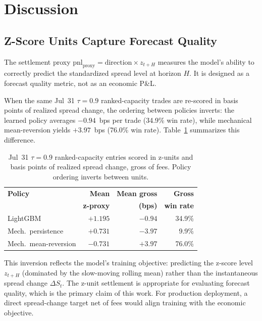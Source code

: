 \section{Discussion}\label{sec:discussion}

\subsection{Z-Score Units Capture Forecast Quality}\label{sec:proxy_gap}

The settlement proxy $\text{pnl}_{\text{proxy}} = \text{direction} \times
z_{t+H}$ measures the model's ability to correctly predict the standardized
spread level at horizon $H$. It is designed as a forecast quality metric, not as
an economic P\&L.

When the same Jul~31 $\tau{=}0.9$ ranked-capacity trades are re-scored in basis points of realized spread change, the ordering between policies inverts: the learned policy averages $-0.94$~bps per trade (34.9\% win rate), while mechanical mean-reversion yields $+3.97$~bps (76.0\% win rate). Table~\ref{tab:bps} summarizes this difference.

\begin{table}[h]
\caption{Jul~31 $\tau{=}0.9$ ranked-capacity entries scored in z-units and basis points of realized spread change, gross of fees. Policy ordering inverts between units.}
\label{tab:bps}
\begin{tabular}{lrrr}
\toprule
\textbf{Policy} & \textbf{Mean} & \textbf{Mean gross} & \textbf{Gross} \\
 & \textbf{z-proxy} & \textbf{(bps)} & \textbf{win rate} \\
\midrule
LightGBM              & $+1.195$ & $-0.94$ & 34.9\% \\
Mech.\ persistence    & $+0.731$ & $-3.97$ & 9.9\% \\
Mech.\ mean-reversion & $-0.731$ & $+3.97$ & 76.0\% \\
\bottomrule
\end{tabular}
\end{table}

This inversion reflects the model's training objective: predicting the z-score level $z_{t+H}$ (dominated by the slow-moving rolling mean) rather than the instantaneous spread change $\Delta S_t$. The z-unit settlement is appropriate for evaluating forecast quality, which is the primary claim of this work. For production deployment, a direct spread-change target net of fees would align training with the economic objective.

